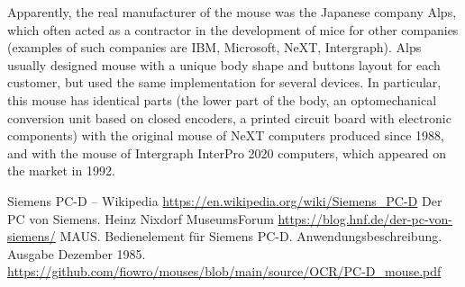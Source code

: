 \documentclass[11pt, a4paper]{article}
\begin{document}
Apparently, the real manufacturer of the mouse was the Japanese company Alps, which often acted as a contractor in the development of mice for other companies (examples of such companies are IBM, Microsoft, NeXT, Intergraph). Alps usually designed mouse with a unique body shape and buttons layout for each customer, but used the same implementation for several devices. In particular, this mouse has identical parts (the lower part of the body, an optomechanical conversion unit based on closed encoders, a printed circuit board with electronic components) with the original mouse of NeXT computers produced since 1988, and with the mouse of Intergraph InterPro 2020 computers, which appeared on the market in 1992.

\begin{thebibliography}{9}
 Siemens PC-D -- Wikipedia \url{https://en.wikipedia.org/wiki/Siemens_PC-D}
 Der PC von Siemens. Heinz Nixdorf MuseumsForum \url{https://blog.hnf.de/der-pc-von-siemens/}
 MAUS. Bedienelement für Siemens PC-D. Anwendungsbeschreibung. Ausgabe Dezember 1985. \url{https://github.com/fiowro/mouses/blob/main/source/OCR/PC-D_mouse.pdf}
\end{thebibliography}
\end{document}
